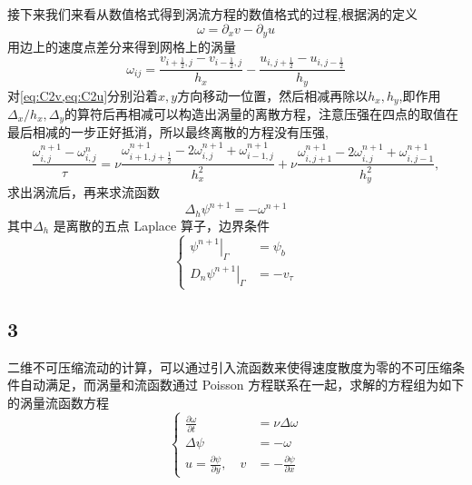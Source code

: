 \documentclass[12pt]{article}
\begin{document}
接下来我们来看从数值格式得到涡流方程的数值格式的过程,根据涡的定义
\begin{equation}
	\omega = \partial_x v - \partial_y u
\end{equation}
用边上的速度点差分来得到网格上的涡量
\begin{equation}
	\omega_{ij} = \frac{v_{i+\frac{1}{2},j}-v_{i-\frac{1}{2},j}}{h_x} - \frac{u_{i,j+\frac{1}{2}}-u_{i,j-\frac{1}{2}}}{h_y}
\end{equation}
对\cref{eq:C2v,eq:C2u}分别沿着$x,y$方向移动一位置，然后相减再除以$h_x,h_y$,即作用$\Delta_x/h_x,\Delta_y$的算符后再相减可以构造出涡量的离散方程，注意压强在四点的取值在最后相减的一步正好抵消，所以最终离散的方程没有压强,
\begin{equation}
	\frac{\omega^{n+1}_{i,j}-\omega^{n}_{i,j}}{\tau}  =\nu  \frac{\omega_{i+1, j+\frac{1}{2}}^{n+1}-2 \omega_{i, j}^{n+1}+\omega_{i-1, j}^{n+1}}{h_{x}^{2}}+\nu \frac{\omega_{i, j+1}^{n+1}-2 \omega_{i, j}^{n+1}+\omega^{n+1}_{i, j-1}}{h_{y}^{2}},
\end{equation}
求出涡流后，再来求流函数
\begin{equation}
	\Delta_{h} \psi^{n+1} = -\omega^{n+1}
\end{equation}
其中$\Delta_{h}$ 是离散的五点 Laplace 算子，边界条件
\begin{equation}
	\left\{\begin{aligned}
		\left.\psi^{n+1}\right|_{\Gamma}       & =\psi_{b}  \\
		\left.D_{n} \psi^{n+1}\right|_{\Gamma} & =-v_{\tau}
	\end{aligned}\right.
\end{equation}


\subsection{3}

二维不可压缩流动的计算，可以通过引入流函数来使得速度散度为零的不可压缩条件自动满足，而涡量和流函数通过 Poisson 方程联系在一起，求解的方程组为如下的涡量流函数方程
\begin{equation}
	\left\{\begin{aligned}
		\frac{\partial \omega}{\partial t}          & =\nu \Delta \omega                 \\
		\Delta \psi                                 & =-\omega                           \\
		u=\frac{\partial \psi}{\partial y}, \quad v & =-\frac{\partial \psi}{\partial x}
	\end{aligned}\right.
	\label{eq:C31}
\end{equation}
\end{document}
